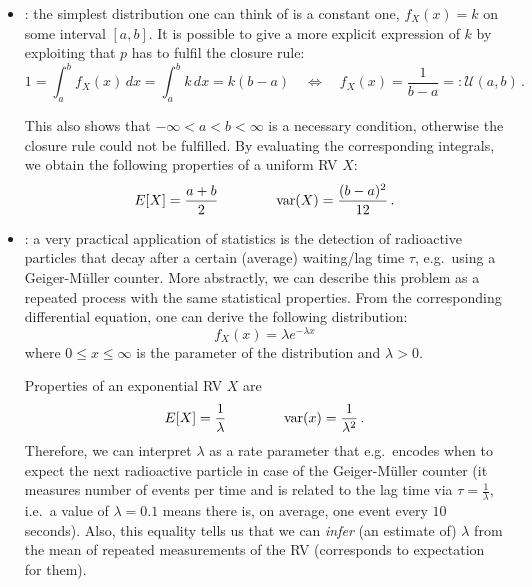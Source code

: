\begin{ex}
\begin{itemize}
\item {}: the simplest distribution one can think of is a constant one, $f_X(x) = k$ on some interval $[a, b]$. It is possible to give a more explicit expression of $k$ by exploiting that $p$ has to fulfil the closure rule:
\begin{equation}
1 = \int_a^b f_X(x) \, dx = \int_a^b k \, dx = k (b - a) \quad \Leftrightarrow \quad f_X(x) = \frac{1}{b - a} =: \mathcal{U}(a, b) \, .
\end{equation}

This also shows that $- \infty < a < b < \infty$ is a necessary condition, otherwise the closure rule could not be fulfilled. By evaluating the corresponding integrals, we obtain the following properties of a uniform RV $X$:
\begin{equation}
E[X] = \frac{a + b}{2} \qquad \qquad \operatorname{var}(X) = \frac{(b - a)^2}{12} \, .
\end{equation}


\item {}: a very practical application of statistics is the detection of radioactive particles that decay after a certain (average) waiting/lag time $\tau$, e.g.~using a Geiger-Müller counter. More abstractly, we can describe this problem as a repeated process with the same statistical properties. From the corresponding differential equation, one can derive the following distribution:
\begin{equation}\label{eq:exp_distr}
f_X(x) = \lambda e^{- \lambda x}
\end{equation}
where $0 \leq x \leq \infty$ is the parameter of the distribution and $\lambda > 0$.%

Properties of an exponential RV $X$ are
\begin{equation}
E[X] = \frac{1}{\lambda} \qquad \qquad \operatorname{var}(x) = \frac{1}{\lambda^2} \, .
\end{equation}
Therefore, we can interpret $\lambda$ as a rate parameter that e.g.~encodes when to expect the next radioactive particle in case of the Geiger-Müller counter (it measures number of events per time and is related to the lag time via $\tau = \frac{1}{\lambda}$, i.e.~a value of $\lambda = 0.1$ means there is, on average, one event every $10$ seconds). Also, this equality tells us that we can \emph{infer} (an estimate of) $\lambda$ from the mean of repeated measurements of the RV (corresponds to expectation for them).



\end{itemize}
\end{ex}
